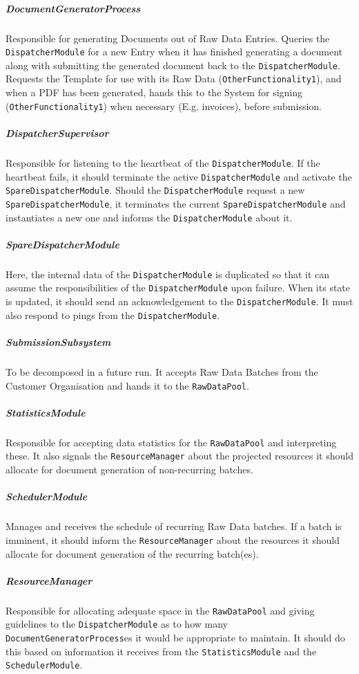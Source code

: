 \documentclass[a4paper,10pt]{article}
\begin{document}
\subparagraph{DocumentGeneratorProcess}
Responsible for generating Documents out of Raw Data Entries. Queries the \texttt{DispatcherModule} for a new Entry when it has finished generating a document along with submitting the generated document back to the \texttt{DispatcherModule}. Requests the Template for use with its Raw Data (\texttt{OtherFunctionality1}), and when a PDF has been generated, hands this to the System for signing (\texttt{OtherFunctionality1}) when necessary (E.g. invoices), before submission.

\subparagraph{DispatcherSupervisor}
Responsible for listening to the heartbeat of the \texttt{DispatcherModule}. If the heartbeat fails, it should terminate the active \texttt{DispatcherModule} and activate the \texttt{SpareDispatcherModule}. Should the \texttt{DispatcherModule} request a new \texttt{SpareDispatcherModule}, it terminates the current \texttt{Spare\-Dispatcher\-Module} and instantiates a new one and informs the \texttt{DispatcherModule} about it.

\subparagraph{SpareDispatcherModule}
Here, the internal data of the \texttt{DispatcherModule} is duplicated so that it can assume the responsibilities of the \texttt{DispatcherModule} upon failure. When its state is updated, it should send an acknowledgement to the \texttt{DispatcherModule}. It must also respond to pings from the \texttt{DispatcherModule}.

\subparagraph{SubmissionSubsystem}
To be decomposed in a future run. It accepts Raw Data Batches from the Customer Organisation and hands it to the \texttt{RawDataPool}.

\subparagraph{StatisticsModule}
Responsible for accepting data statistics for the \texttt{RawDataPool} and interpreting these. It also signals the \texttt{ResourceManager} about the projected resources it should allocate for document generation of non-recurring batches.

\subparagraph{SchedulerModule}
Manages and receives the schedule of recurring Raw Data batches. If a batch is imminent, it should inform the \texttt{ResourceManager} about the resources it should allocate for document generation of the recurring batch(es).

\subparagraph{ResourceManager}
Responsible for allocating adequate space in the \texttt{RawDataPool} and giving guidelines to the \texttt{DispatcherModule} as to how many \texttt{DocumentGeneratorProcess}es it would be appropriate to maintain. It should do this based on information it receives from the \texttt{StatisticsModule} and the \texttt{SchedulerModule}.
\end{document}
